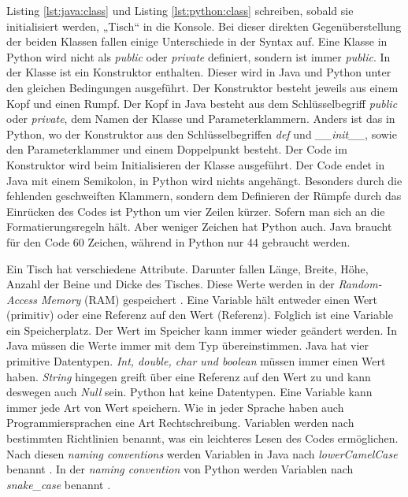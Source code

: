 Listing \ref{lst:java:class} und Listing \ref{lst:python:class} schreiben, sobald sie initialisiert werden, „Tisch“ in die Konsole. Bei dieser direkten Gegenüberstellung der beiden Klassen fallen einige Unterschiede in der Syntax auf. Eine Klasse in Python wird nicht als \textit{public} oder \textit{private} definiert, sondern ist immer \textit{public}. In der Klasse ist ein Konstruktor enthalten. Dieser wird in Java und Python unter den gleichen Bedingungen ausgeführt. Der Konstruktor besteht jeweils aus einem Kopf und einen Rumpf. Der Kopf in Java besteht aus dem Schlüsselbegriff \textit{public} oder \textit{private}, dem Namen der Klasse und Parameterklammern. Anders ist das in Python, wo der Konstruktor aus den Schlüsselbegriffen \textit{def} und \textit{\_\_init\_\_}, sowie den Parameterklammer und einem Doppelpunkt besteht. Der Code im Konstruktor wird beim Initialisieren der Klasse ausgeführt. Der Code endet in Java mit einem Semikolon, in Python wird nichts angehängt. Besonders durch die fehlenden geschweiften Klammern, sondern dem Definieren der Rümpfe durch das Einrücken des Codes ist Python um vier Zeilen kürzer. Sofern man sich an die Formatierungsregeln hält. Aber weniger Zeichen hat Python auch. Java braucht für den Code 60 Zeichen, während in Python nur 44 gebraucht werden. \par

Ein Tisch hat verschiedene Attribute. Darunter fallen Länge, Breite, Höhe, Anzahl der Beine und Dicke des Tisches. Diese Werte werden in der \textit{Random-Access Memory} (RAM) gespeichert \cite{Louis:2010}. Eine Variable hält entweder einen Wert (primitiv) oder eine Referenz auf den Wert (Referenz). Folglich ist eine Variable ein Speicherplatz. Der Wert im Speicher kann immer wieder geändert werden. In Java müssen die Werte immer mit dem Typ übereinstimmen. Java hat vier primitive Datentypen. \textit{Int, double, char und boolean} müssen immer einen Wert haben. \textit{String} hingegen greift über eine Referenz auf den Wert zu und kann deswegen auch \textit{Null} sein. Python hat keine Datentypen. Eine Variable kann immer jede Art von Wert speichern. Wie in jeder Sprache haben auch Programmiersprachen eine Art Rechtschreibung. Variablen werden nach bestimmten Richtlinien benannt, was ein leichteres Lesen des Codes ermöglichen. Nach diesen \textit{naming conventions} werden Variablen in Java nach \textit{lowerCamelCase} benannt \cite{Microsoft:CapCon}. In der \textit{naming convention} von Python werden Variablen nach \textit{snake\_case} benannt \cite{Ims:h-s}. \cite{JavaNC}\cite{PythonStyle}\cite{JVMS}

